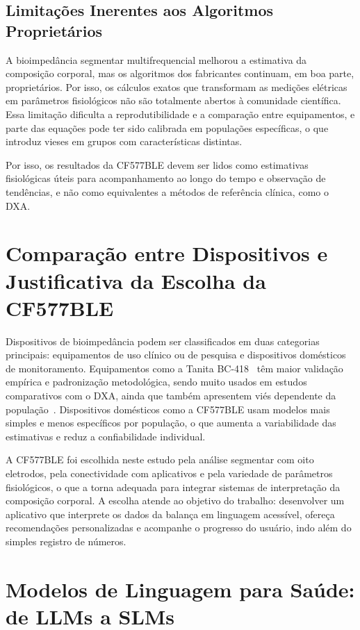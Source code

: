 \subsection{Limitações Inerentes aos Algoritmos Proprietários}

A bioimpedância segmentar multifrequencial melhorou a estimativa da composição corporal,
mas os algoritmos dos fabricantes continuam, em boa parte, proprietários. Por isso, os
cálculos exatos que transformam as medições elétricas em parâmetros fisiológicos não são
totalmente abertos à comunidade científica. Essa limitação dificulta a reprodutibilidade
e a comparação entre equipamentos, e parte das equações pode ter sido calibrada em
populações específicas, o que introduz vieses em grupos com características distintas.

Por isso, os resultados da CF577BLE devem ser lidos como estimativas fisiológicas úteis
para acompanhamento ao longo do tempo e observação de tendências, e não como equivalentes
a métodos de referência clínica, como o DXA.

\section{Comparação entre Dispositivos e Justificativa da Escolha da CF577BLE}

Dispositivos de bioimpedância podem ser classificados em duas categorias principais:
equipamentos de uso clínico ou de pesquisa e dispositivos domésticos de monitoramento.
Equipamentos como a Tanita BC-418~\cite{tanita} têm maior validação empírica e padronização
metodológica, sendo muito usados em estudos comparativos com o DXA, ainda que também
apresentem viés dependente da população~\cite{kyle2004}. Dispositivos domésticos como a
CF577BLE usam modelos mais simples e menos específicos por população, o que aumenta a
variabilidade das estimativas e reduz a confiabilidade individual.

A CF577BLE foi escolhida neste estudo pela análise segmentar com oito eletrodos, pela
conectividade com aplicativos e pela variedade de parâmetros fisiológicos, o que a torna
adequada para integrar sistemas de interpretação da composição corporal. A escolha
atende ao objetivo do trabalho: desenvolver um aplicativo que interprete os dados da
balança em linguagem acessível, ofereça recomendações personalizadas e acompanhe o
progresso do usuário, indo além do simples registro de números.

\section{Modelos de Linguagem para Saúde: de LLMs a SLMs}

